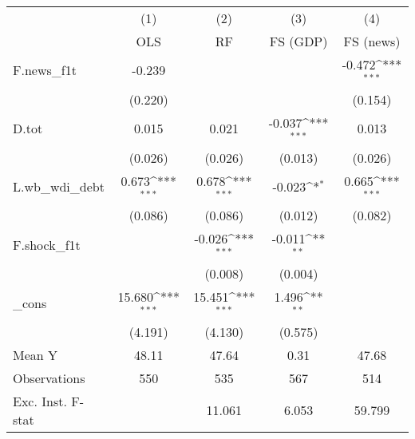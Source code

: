 {
\def\sym#1{\ifmmode^{#1}\else\(^{#1}\)\fi}
\begin{tabular}{l*{4}{c}}
\toprule
            &\multicolumn{1}{c}{(1)}&\multicolumn{1}{c}{(2)}&\multicolumn{1}{c}{(3)}&\multicolumn{1}{c}{(4)}\\
            &\multicolumn{1}{c}{OLS}&\multicolumn{1}{c}{RF}&\multicolumn{1}{c}{FS (GDP)}&\multicolumn{1}{c}{FS (news)}\\
\midrule
F.news\_f1t  &      -0.239         &                     &                     &      -0.472\sym{***}\\
            &     (0.220)         &                     &                     &     (0.154)         \\
\addlinespace
D.tot       &       0.015         &       0.021         &      -0.037\sym{***}&       0.013         \\
            &     (0.026)         &     (0.026)         &     (0.013)         &     (0.026)         \\
\addlinespace
L.wb\_wdi\_debt&       0.673\sym{***}&       0.678\sym{***}&      -0.023\sym{*}  &       0.665\sym{***}\\
            &     (0.086)         &     (0.086)         &     (0.012)         &     (0.082)         \\
\addlinespace
F.shock\_f1t &                     &      -0.026\sym{***}&      -0.011\sym{**} &                     \\
            &                     &     (0.008)         &     (0.004)         &                     \\
\addlinespace
\_cons      &      15.680\sym{***}&      15.451\sym{***}&       1.496\sym{**} &                     \\
            &     (4.191)         &     (4.130)         &     (0.575)         &                     \\
\midrule
Mean Y      &       48.11         &       47.64         &        0.31         &       47.68         \\
Observations&         550         &         535         &         567         &         514         \\
Exc. Inst. F-stat&                     &      11.061         &       6.053         &      59.799         \\
\bottomrule
\end{tabular}
}
